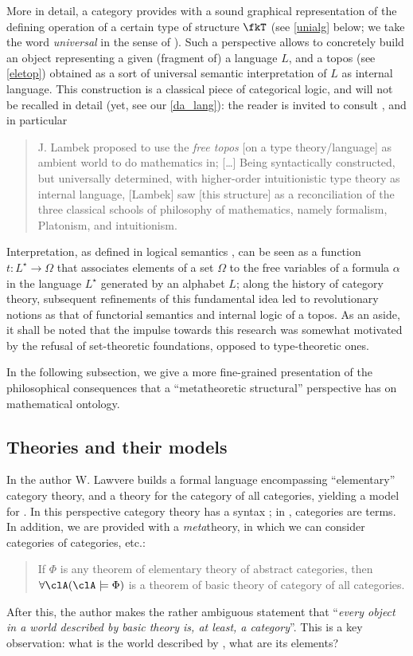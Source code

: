 More in detail, a category provides with a sound graphical representation of the defining operation of a certain type of structure $\fkT$ (see \autoref{unialg} below; we take the word \emph{universal} in the sense of \cite[XV.1]{grillet2007abstract}).
Such a perspective allows to concretely build an object representing a given
(fragment of) a language $L$, and a topos (see \autoref{eletop}) obtained as a sort of universal semantic interpretation of $L$ as internal language. This construction is a classical piece of categorical logic, and will not be recalled in detail (yet, see our \autoref{da_lang}): the reader is invited to consult \cite[II.12, 13, 14]{lambek1988introduction}, and in particular
\begin{quote}
	J. Lambek proposed to use the \emph{free topos} [on a type theory/language] as ambient world to do mathematics in; [\dots\unkern] Being syntactically constructed, but universally determined, with higher-order intuitionistic type theory as internal language, [Lambek] saw [this structure] as a reconciliation of the three classical schools of philosophy of mathematics, namely formalism, Platonism, and intuitionism. \hfill\cite{free_topos}
\end{quote}
Interpretation, as defined in logical semantics \cite{gamut1991logic}, can be seen as a function $t: L^\star \to \Omega$ that associates elements of a set $\Omega$ to the free variables of a formula $\alpha$ in the language $L^\star$ generated by an alphabet $L$; along the history of category theory, subsequent refinements of this fundamental idea led to revolutionary notions as that of functorial semantics and internal logic of a topos.
As an aside, it shall be noted that the impulse towards this research was somewhat motivated by the refusal of set-theoretic foundations, opposed to type-theoretic ones.

In the following subsection, we give a more fine-grained presentation of the philosophical consequences that a ``metatheoretic structural'' perspective has on mathematical ontology.
\subsection{Theories and their models}
In \cite{lajolla} the author W. Lawvere builds a formal language  encompassing ``elementary'' category theory, and a theory  for the category of all categories, yielding a model for . In this perspective category theory has a syntax \CT; in \CT, categories are terms. In addition, we are provided with a \emph{meta}theory, in which we can consider categories of categories, etc.:
\begin{quote}
	If $\Phi$ is any theorem of elementary theory of abstract categories, then $\forall \clA (\clA \models \Phi)$ is a theorem of basic theory of category of all categories. \hfill \cite{lajolla}
\end{quote}
After this, the author makes the rather ambiguous statement that ``\textit{every object in a world described by basic theory is, at least, a category}''. This is a key observation: what is the world described by , what are its elements?

